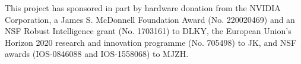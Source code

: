 This project has sponsored in part by hardware donation from the NVIDIA Corporation, a James S. McDonnell Foundation Award (No. 220020469) and an NSF Robust Intelligence grant (No. 1703161) to DLKY, the European Union's Horizon 2020 research and innovation programme (No. 705498) to JK, and NSF awards (IOS-0846088 and IOS-1558068) to MJZH. 
